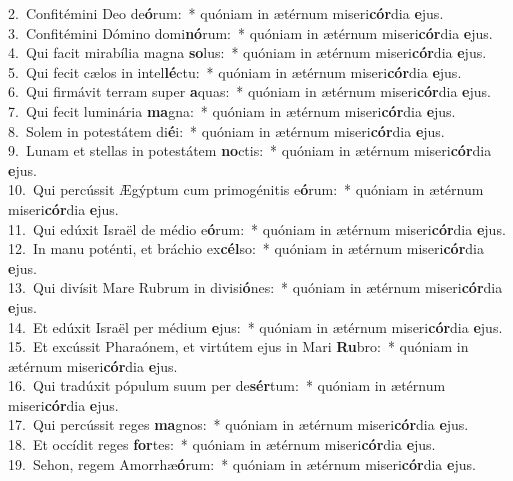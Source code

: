 {2.~}Confitémini Deo de\textbf{ó}rum:~* quóniam in ætérnum miseri\textbf{cór}dia \textbf{e}jus.\\
{3.~}Confitémini Dómino domi\textbf{nó}rum:~* quóniam in ætérnum miseri\textbf{cór}dia \textbf{e}jus.\\
{4.~}Qui facit mirabília magna \textbf{so}lus:~* quóniam in ætérnum miseri\textbf{cór}dia \textbf{e}jus.\\
{5.~}Qui fecit cælos in intel\textbf{lé}ctu:~* quóniam in ætérnum miseri\textbf{cór}dia \textbf{e}jus.\\
{6.~}Qui firmávit terram super \textbf{a}quas:~* quóniam in ætérnum miseri\textbf{cór}dia \textbf{e}jus.\\
{7.~}Qui fecit luminária \textbf{ma}gna:~* quóniam in ætérnum miseri\textbf{cór}dia \textbf{e}jus.\\
{8.~}Solem in potestátem di\textbf{é}i:~* quóniam in ætérnum miseri\textbf{cór}dia \textbf{e}jus.\\
{9.~}Lunam et stellas in potestátem \textbf{no}ctis:~* quóniam in ætérnum miseri\textbf{cór}dia \textbf{e}jus.\\
{10.~}Qui percússit Ægýptum cum primogénitis e\textbf{ó}rum:~* quóniam in ætérnum miseri\textbf{cór}dia \textbf{e}jus.\\
{11.~}Qui edúxit Israël de médio e\textbf{ó}rum:~* quóniam in ætérnum miseri\textbf{cór}dia \textbf{e}jus.\\
{12.~}In manu poténti, et bráchio ex\textbf{cél}so:~* quóniam in ætérnum miseri\textbf{cór}dia \textbf{e}jus.\\
{13.~}Qui divísit Mare Rubrum in divisi\textbf{ó}nes:~* quóniam in ætérnum miseri\textbf{cór}dia \textbf{e}jus.\\
{14.~}Et edúxit Israël per médium \textbf{e}jus:~* quóniam in ætérnum miseri\textbf{cór}dia \textbf{e}jus.\\
{15.~}Et excússit Pharaónem, et virtútem ejus in Mari \textbf{Ru}bro:~* quóniam in ætérnum miseri\textbf{cór}dia \textbf{e}jus.\\
{16.~}Qui tradúxit pópulum suum per de\textbf{sér}tum:~* quóniam in ætérnum miseri\textbf{cór}dia \textbf{e}jus.\\
{17.~}Qui percússit reges \textbf{ma}gnos:~* quóniam in ætérnum miseri\textbf{cór}dia \textbf{e}jus.\\
{18.~}Et occídit reges \textbf{for}tes:~* quóniam in ætérnum miseri\textbf{cór}dia \textbf{e}jus.\\
{19.~}Sehon, regem Amorrhæ\textbf{ó}rum:~* quóniam in ætérnum miseri\textbf{cór}dia \textbf{e}jus.\\
